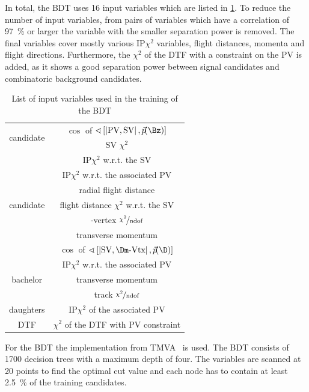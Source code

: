 In total, the \ac{BDT} uses \num{16} input variables which are listed in \cref{tab:BDTInput}.
To reduce the number of input variables, from pairs of variables which have a correlation of \SI{97}{\percent} or larger the variable with the smaller separation power is removed.
The final variables cover mostly various $\text{IP}\chi^2$ variables, flight distances, momenta and flight directions.
Furthermore, the $\chi^2$ of the DTF with a constraint on the \ac{PV} is added, as it shows a good separation power between \BdToDpi signal candidates and combinatoric background candidates.
\begin{table}[tbp]
	\centering
	\caption{List of input variables used in the training of the BDT}
	\begin{tabular}{cc}
		\toprule
		\multirow{2}{*}{\Bz candidate}	& $\cos$ of $\sphericalangle\left[\left|\text{PV},\text{SV}\right|,\vec{p}\!(\Bz)\right]$ \\
										& \ac{SV} $\chi^2$\\
		\midrule
		\multirow{7}{*}{\Dm candidate}	& $\text{IP}\chi^2$ w.r.t. the \ac{SV}\\
										& $\text{IP}\chi^2$ w.r.t. the associated PV\\
										& radial flight distance\\
										& flight distance $\chi^2$ w.r.t. the \ac{SV}\\
										& \Dm-vertex $\nicefrac{\chi^2}{\text{ndof}}$\\
										& transverse momentum \pt \\
										& $\cos$ of $\sphericalangle\left[\left|\text{SV},\Dm\text{-Vtx}\right|,\vec{p}\!(\D)\right]$ \\
		\midrule
		\multirow{3}{*}{bachelor \pion}	& $\text{IP}\chi^2$ w.r.t. the associated PV\\
										& transverse momentum \pt\\
										& track $\nicefrac{\chi^2}{\text{ndof}}$\\
		\midrule
		\Dm daughters					& $\text{IP}\chi^2$ of the associated \ac{PV}\\
		\midrule
		DTF 							& $\chi^2$ of the DTF with \ac{PV} constraint \\
		\bottomrule
	\end{tabular}
	\label{tab:BDTInput}
\end{table}
For the \ac{BDT} the implementation from TMVA~\cite{Hocker:2007ht} is used.
The \ac{BDT} consists of \num{1700} decision trees with a maximum depth of four.
The variables are scanned at \num{20} points to find the optimal cut value and each node has to contain at least \SI{2.5}{\percent} of the training candidates.
